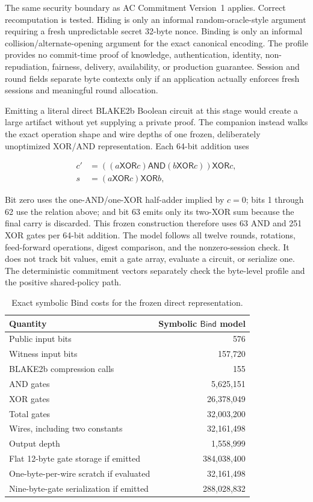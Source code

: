 The same security boundary as AC Commitment Version~1 applies. Correct
recomputation is tested. Hiding is only an informal random-oracle-style
argument requiring a fresh unpredictable secret 32-byte nonce. Binding is
only an informal collision/alternate-opening argument for the exact canonical
encoding. The profile provides no commit-time proof of knowledge,
authentication, identity, non-repudiation, fairness, delivery, availability,
or production guarantee. Session and round fields separate byte contexts only
if an application actually enforces fresh sessions and meaningful round
allocation.

Emitting a literal direct BLAKE2b Boolean circuit at this stage would create a
large artifact without yet supplying a private proof. The companion instead
walks the exact operation shape and wire depths of one frozen, deliberately
unoptimized XOR/AND representation. Each 64-bit addition uses

\[
\begin{aligned}
 c'&=((a\mathbin{\mathsf{XOR}}c)
       \mathbin{\mathsf{AND}}(b\mathbin{\mathsf{XOR}}c))
       \mathbin{\mathsf{XOR}}c,\\
 s&=(a\mathbin{\mathsf{XOR}}c)\mathbin{\mathsf{XOR}}b,
\end{aligned}
\]

Bit zero uses the one-AND/one-XOR half-adder implied by \(c=0\);
bits 1 through 62 use the relation above; and bit 63 emits only its two-XOR
sum because the final carry is discarded. This frozen construction therefore
uses 63 AND and 251 XOR gates per 64-bit addition. The model follows all
twelve rounds, rotations,
feed-forward operations, digest comparison, and the nonzero-session check.
It does not track bit values, emit a gate array, evaluate a circuit, or
serialize one. The deterministic commitment vectors separately check the
byte-level profile and the positive shared-policy path.

\begin{table}[htbp]
\centering
\begin{tabular}{lr}
\hline
Quantity & Symbolic \(\mathsf{Bind}\) model \\
\hline
Public input bits & 576 \\
Witness input bits & 157,720 \\
BLAKE2b compression calls & 155 \\
AND gates & 5,625,151 \\
XOR gates & 26,378,049 \\
Total gates & 32,003,200 \\
Wires, including two constants & 32,161,498 \\
Output depth & 1,558,999 \\
Flat 12-byte gate storage if emitted & 384,038,400 \\
One-byte-per-wire scratch if evaluated & 32,161,498 \\
Nine-byte-gate serialization if emitted & 288,028,832 \\
\hline
\end{tabular}
\caption{Exact symbolic Bind costs for the frozen direct representation.}
\label{tab:ttt-bind-cost}
\end{table}

